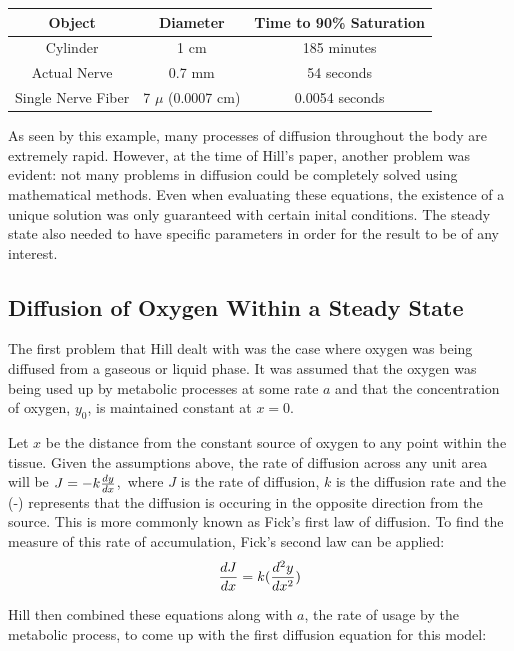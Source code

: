 \documentclass{article}
\begin{document}
\begin{tabular}{|c|c|c|}
    \hline
    Object             & Diameter            & Time to 90\% Saturation \\
    \hline
    Cylinder           & 1 cm                & 185 minutes             \\
    Actual Nerve       & 0.7 mm              & 54 seconds              \\
    Single Nerve Fiber & 7 $\mu$ (0.0007 cm) & 0.0054 seconds          \\
    \hline
\end{tabular}
\vspace*{1cm}

As seen by this example, many processes of diffusion throughout the body are extremely rapid. However, at the time of Hill's
paper, another problem was evident: not many problems in diffusion could be completely solved using mathematical methods.
Even when evaluating these equations, the existence of a unique solution was only guaranteed with certain inital conditions.
The steady state also needed to have specific parameters in order for the result to be of any interest.
\subsection{Diffusion of Oxygen Within a Steady State}

The first problem that Hill dealt with was the case where oxygen was being diffused from a gaseous or liquid phase.
It was assumed that the oxygen was being used up by metabolic processes at some rate $a$ and that the concentration
of oxygen, $y_0$, is maintained constant at $x = 0$.

\vspace*{0.5cm}

Let $x$ be the distance from the constant source of oxygen to any point within the tissue. Given the assumptions above,
the rate of diffusion across any unit area will be $ J = -k \* \frac{dy}{dx}$,\, where $J$ is the rate of diffusion, $k$ is the diffusion rate and the (-)
represents that the diffusion is occuring in the opposite direction from the source. This is more commonly known as Fick's
first law of diffusion. To find the measure of this rate of accumulation, Fick's second law can be applied:
\begin{equation}
    \frac{dJ}{dx} = k \* (\frac{d^2y}{dx^2})
\end{equation}

Hill then combined these equations along with $a$, the rate of usage by the metabolic process, to come up with the first diffusion equation for
this model:
\end{document}
